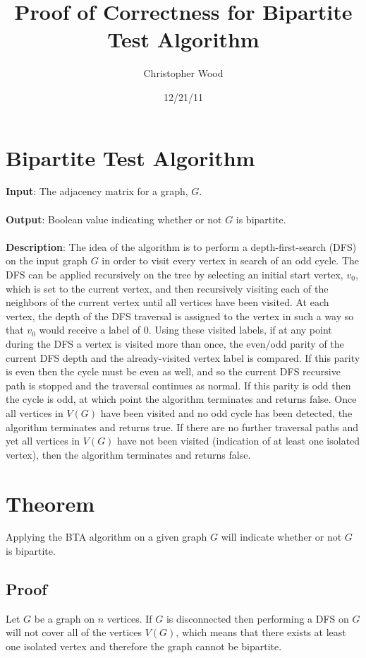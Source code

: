 \documentclass[a4paper,10pt]{article}
\title{Proof of Correctness for Bipartite Test Algorithm}
\author{Christopher Wood}
\date{12/21/11}
\begin{document}
\maketitle

\section{Bipartite Test Algorithm}
{\bf Input}: The adjacency matrix for a graph, $G$. \\ \\
{\bf Output}: Boolean value indicating whether or not $G$ is bipartite. \\ \\
{\bf Description}: The idea of the algorithm is to perform a depth-first-search (DFS) on the input graph $G$ in order to visit every vertex in search of an odd cycle. The DFS can be applied recursively on the tree by selecting an initial start vertex, $v_{0}$, which is set to the current vertex, and then recursively visiting each of the neighbors of the current vertex until all vertices have been visited. At each vertex, the depth of the DFS traversal is assigned to the vertex in such a way so that $v_{0}$ would receive a label of $0$. Using these visited labels, if at any point during the DFS a vertex is visited more than once, the even/odd parity of the current DFS depth and the already-visited vertex label is compared. If this parity is even then the cycle must be even as well, and so the current DFS recursive path is stopped and the traversal continues as normal. If this parity is odd then the cycle is odd, at which point the algorithm terminates and returns false. Once all vertices in $V(G)$ have been visited and no odd cycle has been detected, the algorithm terminates and returns true. If there are no further traversal paths and yet all vertices in $V(G)$ have not been visited (indication of at least one isolated vertex), then the algorithm terminates and returns false.

\section{Theorem}
Applying the BTA algorithm on a given graph $G$ will indicate whether or not $G$ is bipartite.

\subsection{Proof}
Let $G$ be a graph on $n$ vertices. If $G$ is disconnected then performing a DFS on $G$ will not cover all of the vertices $V(G)$, which means that there exists at least one isolated vertex and therefore the graph cannot be bipartite. 
\end{document}

